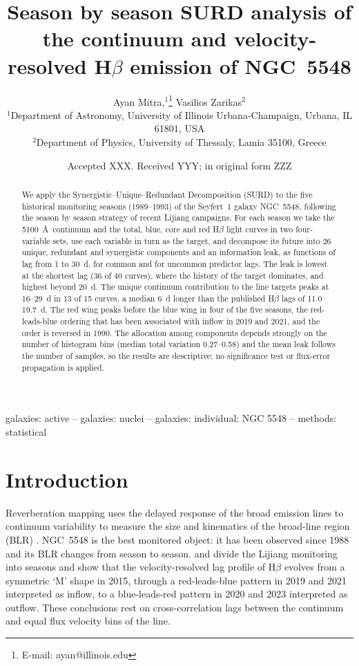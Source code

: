 \documentclass[fleqn,usenatbib]{mnras}
\title[SURD in five seasons of NGC 5548]{Season by season SURD analysis of the continuum and velocity-resolved H$\beta$ emission of NGC~5548}
\author[A. Mitra \& V. Zarikas]{
Ayan Mitra,$^{1}$\thanks{E-mail: ayan@illinois.edu}
Vasilios Zarikas$^{2}$
\\
$^{1}$Department of Astronomy, University of Illinois Urbana-Champaign, Urbana, IL 61801, USA\\
$^{2}$Department of Physics, University of Thessaly, Lamia 35100, Greece
}
\date{Accepted XXX. Received YYY; in original form ZZZ}
\begin{document}
\label{firstpage}
\pagerange{\pageref{firstpage}--\pageref{LastPage}}
\maketitle

\begin{abstract}
We apply the Synergistic--Unique--Redundant Decomposition (SURD) to the five historical monitoring seasons (1989--1993) of the Seyfert~1 galaxy NGC~5548, following the season by season strategy of recent Lijiang campaigns. For each season we take the 5100~\AA\ continuum and the total, blue, core and red H$\beta$ light curves in two four-variable sets, use each variable in turn as the target, and decompose its future into 26 unique, redundant and synergistic components and an information leak, as functions of lag from 1 to 30~d, for common and for uncommon predictor lags. The leak is lowest at the shortest lag (36 of 40 curves), where the history of the target dominates, and highest beyond 20~d. The unique continuum contribution to the line targets peaks at 16--29~d in 13 of 15 curves, a median 6~d longer than the published H$\beta$ lags of 11.0--19.7~d. The red wing peaks before the blue wing in four of the five seasons, the red-leads-blue ordering that has been associated with inflow in 2019 and 2021, and the order is reversed in 1990. The allocation among components depends strongly on the number of histogram bins (median total variation 0.27--0.58) and the mean leak follows the number of samples, so the results are descriptive; no significance test or flux-error propagation is applied.
\end{abstract}
\begin{keywords}
galaxies: active -- galaxies: nuclei -- galaxies: individual: NGC 5548 -- methods: statistical
\end{keywords}

\section{Introduction}
Reverberation mapping uses the delayed response of the broad emission lines to continuum variability to measure the size and kinematics of the broad-line region (BLR) \citep{Peterson2004ApJ}. NGC~5548 is the best monitored object: it has been observed since 1988 and its BLR changes from season to season. \citet{Lu2022} and \citet{Xi2025} divide the Lijiang monitoring into seasons and show that the velocity-resolved lag profile of H$\beta$ evolves from a symmetric `M' shape in 2015, through a red-leads-blue pattern in 2019 and 2021 interpreted as inflow, to a blue-leads-red pattern in 2020 and 2023 interpreted as outflow. These conclusions rest on cross-correlation lags between the continuum and equal flux velocity bins of the line.
\end{document}
